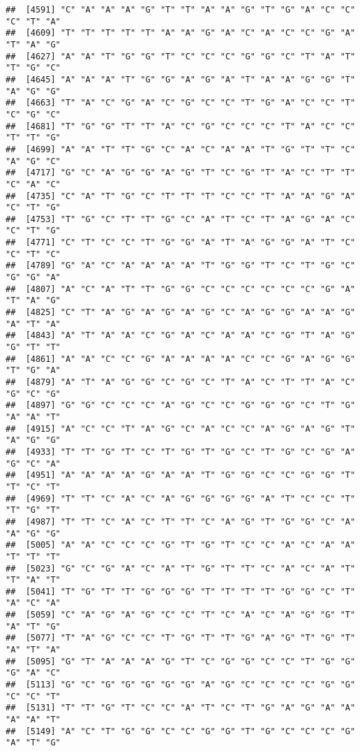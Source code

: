 \documentclass[
]{article}
\begin{document}
\begin{verbatim}
##  [4591] "C" "A" "A" "A" "G" "T" "T" "A" "A" "G" "T" "G" "A" "C" "C" "C" "T" "A"
##  [4609] "T" "T" "T" "T" "T" "A" "A" "G" "A" "C" "A" "C" "C" "G" "A" "T" "A" "G"
##  [4627] "A" "A" "T" "G" "G" "T" "C" "C" "C" "G" "G" "C" "T" "A" "T" "T" "G" "C"
##  [4645] "A" "A" "A" "T" "G" "G" "A" "G" "A" "T" "A" "A" "G" "G" "T" "A" "G" "G"
##  [4663] "T" "A" "C" "G" "A" "C" "G" "C" "C" "T" "G" "A" "C" "C" "T" "C" "G" "C"
##  [4681] "T" "G" "G" "T" "T" "A" "C" "G" "C" "C" "C" "T" "A" "C" "C" "T" "T" "G"
##  [4699] "A" "A" "T" "T" "G" "C" "A" "C" "A" "A" "T" "G" "T" "T" "C" "A" "G" "C"
##  [4717] "G" "C" "A" "G" "G" "A" "G" "T" "C" "G" "T" "A" "C" "T" "T" "C" "A" "C"
##  [4735] "C" "A" "T" "G" "C" "T" "T" "T" "C" "C" "T" "A" "A" "G" "A" "C" "T" "G"
##  [4753] "T" "G" "C" "T" "T" "G" "C" "A" "T" "C" "T" "A" "G" "A" "C" "C" "T" "G"
##  [4771] "C" "T" "C" "C" "T" "G" "G" "A" "T" "A" "G" "G" "A" "T" "C" "C" "T" "C"
##  [4789] "G" "A" "C" "A" "A" "A" "A" "T" "G" "G" "T" "C" "T" "G" "C" "G" "G" "A"
##  [4807] "A" "C" "A" "T" "T" "G" "G" "C" "C" "C" "C" "C" "C" "G" "A" "T" "A" "G"
##  [4825] "C" "T" "A" "G" "A" "G" "A" "G" "C" "A" "G" "G" "A" "A" "G" "A" "T" "A"
##  [4843] "A" "T" "A" "A" "C" "G" "A" "C" "A" "A" "C" "G" "T" "A" "G" "G" "T" "T"
##  [4861] "A" "A" "C" "C" "G" "A" "A" "A" "A" "C" "C" "G" "A" "G" "G" "T" "G" "A"
##  [4879] "A" "T" "A" "G" "G" "C" "G" "C" "T" "A" "C" "T" "T" "A" "C" "G" "C" "G"
##  [4897] "G" "G" "C" "C" "C" "A" "G" "C" "C" "G" "G" "G" "C" "T" "G" "A" "A" "T"
##  [4915] "A" "C" "C" "T" "A" "G" "C" "A" "C" "C" "A" "G" "A" "G" "T" "A" "G" "G"
##  [4933] "T" "T" "G" "T" "C" "T" "G" "T" "G" "C" "T" "G" "C" "G" "A" "G" "C" "A"
##  [4951] "A" "A" "A" "A" "G" "A" "A" "T" "G" "G" "C" "C" "G" "G" "T" "T" "C" "T"
##  [4969] "T" "T" "C" "A" "C" "A" "G" "G" "G" "G" "A" "T" "C" "C" "T" "T" "G" "T"
##  [4987] "T" "T" "C" "A" "C" "T" "T" "C" "A" "G" "T" "G" "G" "C" "A" "A" "G" "G"
##  [5005] "A" "A" "C" "C" "C" "G" "T" "G" "T" "C" "C" "A" "C" "A" "A" "T" "T" "T"
##  [5023] "G" "C" "G" "A" "C" "A" "T" "G" "T" "T" "C" "A" "C" "A" "T" "T" "A" "T"
##  [5041] "T" "G" "T" "T" "G" "G" "G" "T" "T" "T" "T" "G" "G" "C" "T" "A" "C" "A"
##  [5059] "C" "A" "G" "A" "G" "C" "C" "T" "C" "A" "C" "A" "G" "G" "T" "A" "T" "G"
##  [5077] "T" "A" "G" "C" "C" "T" "G" "T" "T" "G" "A" "G" "T" "G" "T" "A" "T" "A"
##  [5095] "G" "T" "A" "A" "A" "G" "T" "C" "G" "G" "C" "C" "T" "G" "G" "G" "A" "C"
##  [5113] "G" "C" "G" "G" "G" "G" "G" "A" "G" "C" "C" "C" "C" "G" "G" "C" "C" "T"
##  [5131] "T" "T" "G" "T" "C" "C" "A" "T" "C" "T" "G" "A" "G" "A" "A" "A" "A" "T"
##  [5149] "A" "C" "T" "G" "G" "C" "C" "G" "G" "T" "G" "C" "C" "C" "G" "A" "T" "G"

\end{verbatim}
\end{document}
